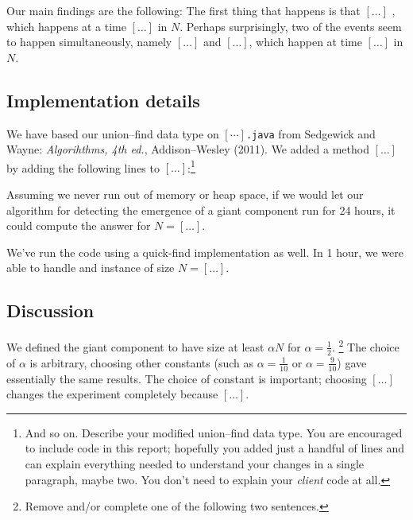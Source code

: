\documentclass{tufte-handout}
\begin{document}
\medskip\noindent
Our main findings are the following:
The first thing that happens is that $[\ldots]$ , which happens at a time $[\ldots]$  in $N$.
Perhaps surprisingly, two of the events seem to happen simultaneously, namely $[\ldots]$ and $[\ldots]$, which happen at time $[\ldots]$ in $N$.


\subsection{Implementation details}

We have based our union--find data type on $[\cdots]${\tt .java} from Sedgewick and Wayne: {\em Algorihthms, 4th ed.}, Addison--Wesley (2011).
We added a method $[\ldots]$ by adding the following lines to $[\dots]$:\footnote{And so on. Describe your modified union--find data type.
You are encouraged to include code in this report; hopefully you added just a handful of lines and can explain everything needed to understand your changes in a single paragraph, maybe two. 
You don't need to explain your \emph{client} code at all.}

Assuming we never run out of memory or heap space, if we would let our algorithm for detecting the emergence of a giant component run for 24 hours, it could compute the answer for $N= [\ldots]$.

We've run the code using a quick-find implementation as well.
In 1 hour, we were able to handle and instance of size $N=[\ldots]$.



\subsection{Discussion}

We defined the giant component to have size at least $\alpha N$ for $\alpha = \frac{1}{2}$. \footnote{Remove and/or complete one of the following two sentences.}
The choice of $\alpha$ is arbitrary, choosing other constants (such as $\alpha=\frac{1}{10}$ or $\alpha=\frac{9}{10}$) gave essentially the same results.
The choice of constant is important; choosing $[\ldots]$ changes the experiment completely because $[\ldots]$.
\end{document}

